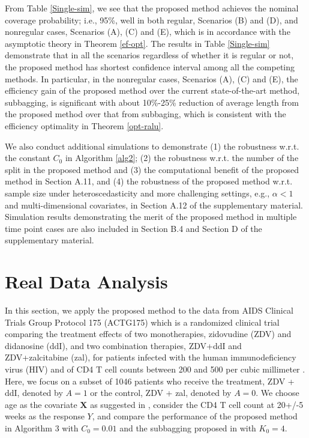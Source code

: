 \documentclass[11pt]{article}
\theoremstyle{referenceplain}
\theoremstyle{referencedefinition}
\theoremstyle{referenceremark}
\begin{document}
From Table \ref{Single-sim}, we see that the proposed method achieves the nominal coverage probability; i.e., 95\%, well in both regular, Scenarios (B) and (D), and nonregular cases, Scenarios (A), (C) and (E), which is in accordance with the asymptotic theory in Theorem \ref{ef-opt}. The results in Table \ref{Single-sim} demonstrate that in all the scenarios regardless of whether it is regular or not, the proposed method has shortest confidence interval among all the competing methods. In particular, in the nonregular cases, Scenarios (A), (C) and (E), the efficiency gain of the proposed method over the current state-of-the-art method, subbagging, is significant with about 10\%-25\% reduction of average length from the proposed method over that from subbaging, which is consistent with the efficiency optimality in Theorem \ref{opt-ralu}. 

We also conduct additional simulations to demonstrate (1) the robustness w.r.t. the constant {$C_0$} in Algorithm \ref{alg2}; (2) the robustness w.r.t. the number of the split in the proposed method and (3) the computational benefit of the proposed method in Section A.11, and (4) the robustness of the proposed method w.r.t. sample size under heteroscedasticity and more challenging settings, e.g., $\alpha<1$ and multi-dimensional covariates, in Section A.12 of the supplementary material. Simulation results demonstrating the merit of the proposed method in multiple time point cases are also included in Section B.4 and Section D of the supplementary material. 

\section{Real Data Analysis}
In this section, we apply the proposed method to the data from AIDS Clinical Trials Group Protocol 175 (ACTG175) which is a randomized clinical trial comparing the treatment effects of two monotherapies, zidovudine (ZDV) and didanosine (ddI), and two combination therapies, ZDV+ddI and ZDV+zalcitabine (zal), for patients infected with the human immunodeficiency virus (HIV) and of CD4 T cell counts between 200 and 500 per cubic millimeter \citep{hammer1996trial}. Here, we focus on a subset of 1046 patients  who receive the treatment, ZDV + ddI, denoted by $A=1$ or the control, ZDV + zal, denoted by $A=0$. We choose age as the covariate $\mathbf{X}$ as suggested in \citet{fan2017concordance}, consider the CD4 T cell count at 20+/-5 weeks as the response $Y$, and compare the performance of the proposed method in Algorithm 3 with {$C_0=0.01$} and the subbagging proposed in \citet{shi2020breaking} with $K_0=4$.
\end{document}
